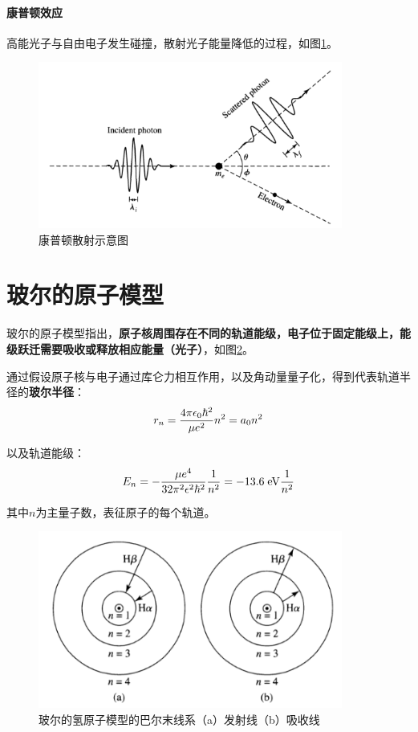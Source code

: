 \paragraph{康普顿效应}
高能光子与自由电子发生碰撞，散射光子能量降低的过程，如图\ref{fig:compton}。

\begin{figure}[hbt]
  \centering
  \includegraphics[width=10cm]{chapters/05/compton}
  \caption{康普顿散射示意图}
  \label{fig:compton}
\end{figure}

\section{玻尔的原子模型}
玻尔的原子模型指出，\textbf{原子核周围存在不同的轨道能级，电子位于固定能级上，能级跃迁需要吸收或释放相应能量（光子）}，如图\ref{fig:atom}。

通过假设原子核与电子通过库仑力相互作用，以及角动量量子化，得到代表轨道半径的\textbf{玻尔半径}：
\begin{equation}
  r_n={4\pi \epsilon_0 \hbar^2 \over \mu e^2}n^2=a_0n^2
\end{equation}

以及轨道能级：
\begin{equation}
  E_n=-{\mu e^4\over 32\pi^2\epsilon^2\hbar^2}{1\over n^2}=-13.6\;\mathrm{eV}{1\over n^2}
\end{equation}

其中$n$为主量子数，表征原子的每个轨道。

\begin{figure}
  \centering
  \includegraphics[width=10cm]{chapters/05/atom}
  \caption{玻尔的氢原子模型的巴尔末线系（a）发射线（b）吸收线}
  \label{fig:atom}
\end{figure}

